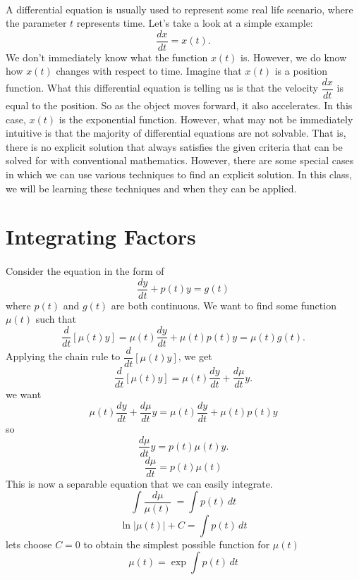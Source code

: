 \documentclass[font =22]{report}
\begin{document}
\paragraph{}
 A  differential equation is usually used to represent some real life scenario, where the parameter $t$ represents time.  Let's take a look at a simple example: 
\[
\frac{dx}{dt} = x(t).
\]
We don't immediately know what the function $x(t)$ is. However, we do know how $x(t)$ changes with respect to time. Imagine that $x(t)$ is a position function. What this differential equation is telling us is that the velocity $\dfrac{dx}{dt}$ is equal to the position. So as the object moves forward, it also accelerates.
In this case, $x(t)$ is the exponential function. However, what may not be immediately intuitive is that the majority of differential equations are not solvable. That is, there is no  explicit solution that always satisfies the given criteria that can be solved for with conventional mathematics. However, there are some special cases in which we can use various techniques to find an explicit solution. In this class, we will be learning these techniques and when they can be applied. 



\section{Integrating Factors }
\paragraph{}
 Consider the  equation in the form of 
\[ \frac{dy}{dt} + p(t)y = g(t)\]
where $p(t)$ and $g(t)$ are both continuous. We want to find some function $ \mu (t)$ such that 
  \[
  \frac{d}{dt}[\mu (t)y] = \mu(t)\frac{dy}{dt} + \mu(t)p(t)y = \mu(t)g(t).
  \] 
 Applying the chain rule to $\dfrac{d}{dt}[\mu (t)y]$,  we get 
\[
\frac{d}{dt}[\mu (t)y] = \mu(t) \frac{dy}{dt}  + \frac{d\mu}{dt}y.
\]
we want
 \[ 
 \mu(t) \frac{dy}{dt}  + \frac{d\mu}{dt}y = \mu(t)\frac{dy}{dt} + \mu(t)p(t)y 
 \]
 so
 \[
\frac{d\mu}{dt}y = p(t)\mu(t)y .  
\]
\[
  \frac{d\mu}{dt} = p(t)\mu(t)
 \]
 This is now a separable equation that we can easily integrate.
 \[
 \int \frac{d\mu}{\mu(t)}\ =  \int p(t)\,dt
 \]
 \[
 \ln|\mu(t)| + C = \int p(t)\,dt
 \]
 lets choose $C=0$ to obtain the simplest possible function for $\mu(t)$
 \[
 \mu(t) = \exp\int p(t) \,dt
 \]
   
\end{document}
